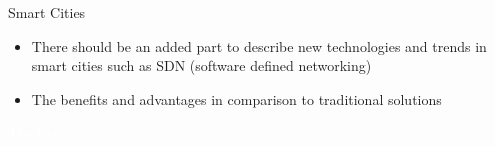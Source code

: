 \documentclass{beamer}
\begin{document}
\begin{frame}{Smart Cities}
  \begin{itemize}
  \item There should be an added part to describe new technologies and trends in
    smart cities such as SDN (software defined networking)
  \item The benefits and advantages in comparison to traditional solutions
  \end{itemize}
\end{frame}


\bgroup
{}
\begin{frame}[t,plain]{}{}
  \begin{center}
    {\tiny \textcolor{white}{The End}}
  \end{center}
\end{frame}
\egroup
\end{document}
